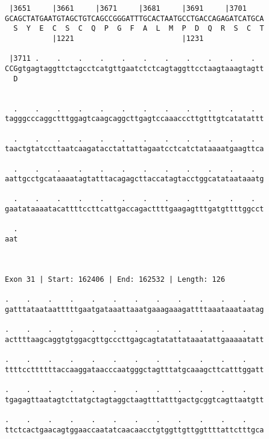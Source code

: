 \documentclass{article}
\begin{document}
\begin{Verbatim}
 |3651     |3661     |3671     |3681     |3691     |3701    
GCAGCTATGAATGTAGCTGTCAGCCGGGATTTGCACTAATGCCTGACCAGAGATCATGCA
  S  Y  E  C  S  C  Q  P  G  F  A  L  M  P  D  Q  R  S  C  T
           |1221                         |1231              
  
 |3711 .    .    .    .    .    .    .    .    .    .    .  
CCGgtgagtaggttctagcctcatgttgaatctctcagtaggttcctaagtaaagtagtt
  D                                                         
                                                            
  
  .    .    .    .    .    .    .    .    .    .    .    .  
tagggcccaggctttggagtcaagcaggcttgagtccaaacccttgtttgtcatatattt
                                                            
  .    .    .    .    .    .    .    .    .    .    .    .  
taactgtatccttaatcaagatacctattattagaatcctcatctataaaatgaagttca
                                                            
  .    .    .    .    .    .    .    .    .    .    .    .  
aattgcctgcataaaatagtatttacagagcttaccatagtacctggcatataataaatg
                                                            
  .    .    .    .    .    .    .    .    .    .    .    .  
gaatataaaatacattttccttcattgaccagacttttgaagagtttgatgttttggcct
                                                            
  .
aat
   
   
 
Exon 31 | Start: 162406 | End: 162532 | Length: 126
 
.    .    .    .    .    .    .    .    .    .    .    .    
gatttataataatttttgaatgataaattaaatgaaagaaagattttaaataaataatag
                                                            
.    .    .    .    .    .    .    .    .    .    .    .    
acttttaagcaggtgtggacgttgcccttgagcagtatattataaatattgaaaaatatt
                                                            
.    .    .    .    .    .    .    .    .    .    .    .    
ttttccttttttaccaaggataacccaatgggctagtttatgcaaagcttcatttggatt
                                                            
.    .    .    .    .    .    .    .    .    .    .    .    
tgagagttaatagtcttatgctagtaggctaagtttatttgactgcggtcagttaatgtt
                                                            
.    .    .    .    .    .    .    .    .    .    .    .    
ttctcactgaacagtggaaccaatatcaacaacctgtggttgttggttttattctttgca
                                                            

\end{Verbatim}
\end{document}
